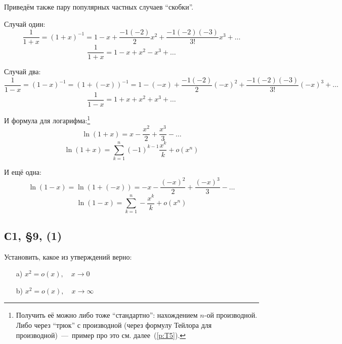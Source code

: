\documentclass[a4paper,12pt]{article}
\begin{document}
  \begin{example}
    Приведём также пару популярных частных случаев ``скобки''.

    Случай один:
    \[
      \frac{1}{1 + x} = (1 + x)^{-1} = 1 - x + \frac{-1(-2)}{2} x^2 + \frac{-1(-2)(-3)}{3!} x^3 + \ldots
    \]
    \begin{equation}\label{eq:1-div-plus}
      \frac{1}{1 + x} = 1 - x + x^2 - x^3 + \ldots
    \end{equation}

    Случай два:
    \[
      \frac{1}{1 - x} = (1 - x)^{-1} = (1 + (-x))^{-1} = 1 - (-x) + \frac{-1(-2)}{2} (-x)^2 + \frac{-1(-2)(-3)}{3!} (-x)^3 + \ldots
    \]
    \begin{equation}\label{eq:1-div-minus}
      \frac{1}{1 - x} = 1 + x + x^2 + x^3 + \ldots
    \end{equation}
  \end{example}

  И формула для логарифма:\footnote{
    Получить её можно либо тоже ``стандартно'': нахождением $n$-ой производной.
    Либо через ``трюк'' с производной (через формулу Тейлора для производной)~---~пример про это см. далее~(\ref{p:T5}).
  }
  \[
    \ln{(1 + x)} = x - \frac{x^2}{2} + \frac{x^3}{3} - \ldots
  \]
  \begin{equation}\label{eq:log-plus}
    \ln{(1 + x)} = \sum_{k = 1}^n (-1)^{k - 1} \frac{x^k}{k} + o(x^n)
  \end{equation}

  И ещё одна:
  \[
    \ln{(1 - x)} = \ln{(1 + (-x))} = -x - \frac{(-x)^2}{2} + \frac{(-x)^3}{3} - \ldots
  \]
  \begin{equation}\label{eq:log-minus}
    \ln{(1 - x)} = \sum_{k = 1}^n - \frac{x^k}{k} + o(x^n)
  \end{equation}

  
  \subsection{С1, \S 9, (1)}
  
  Установить, какое из утверждений верно:
  \begin{itemize}
    \item[a)] $x^2 = o(x),\quad x \to 0$
    \item[b)] $x^2 = o(x),\quad x \to \infty$
  \end{itemize}
  
\end{document}
